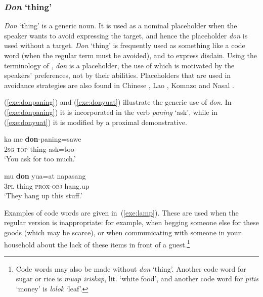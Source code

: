 \documentclass[output=paper,colorlinks,citecolor=brown
\ChapterDOI{10.5281/zenodo.15697587}
]{langscibook}
\begin{document}
\subsubsection{\textit{Don} `thing'}
\textit{Don} `thing' is a generic noun. It is used as a nominal placeholder when the speaker wants to avoid expressing the target, and hence the placeholder \textit{don} is used without a target. \textit{Don} `thing' is frequently used as something like a code word (when the regular term must be avoided), and to express disdain. Using the terminology of \citet{seraku2024placeholders}, \textit{don} is a placeholder, the use of which is motivated by the speakers' preferences, not by their abilities. Placeholders that are used in avoidance strategies are also found in Chinese \citep{cheung2015uttering}, Lao \citep{enfield2003definition}, Komnzo \citep{chapters/doehler} and Nasal \citep{chapters/billings_mcdonnell}.


(\ref{exe:donpaning}) and (\ref{exe:donyuat}) illustrate the generic use of \textit{don}. In (\ref{exe:donpaning}) it is incorporated in the verb \textit{paning} `ask', while in (\ref{exe:donyuat}) it is modified by a proximal demonstrative. %

\begin{exe}
	\ex \gll ka me \textbf{don}-paning=sawe\\
	\textsc{2sg} \textsc{top} thing-ask=too\\
	\glt `You ask for too much.' 
	\label{exe:donpaning}
\end{exe}

\begin{exe}
	\ex \gll mu \textbf{don} yua=at napasang\\
	\textsc{3pl} thing \textsc{prox-obj} hang.up\\
	\glt `They hang up this stuff.' 
	\label{exe:donyuat}
\end{exe}

Examples of code words are given in~(\ref{exe:lamp}). These are used when the regular version is inappropriate: for example, when begging someone else for these goods (which may be scarce), or when communicating with someone in your household about the lack of these items in front of a guest.\footnote{Code words may also be made without \textit{don} `thing'. Another code word for sugar or rice is \textit{muap iriskap}, lit. `white food', and another code word for \textit{pitis} `money' is \textit{lolok} `leaf'.} 
\end{document}
